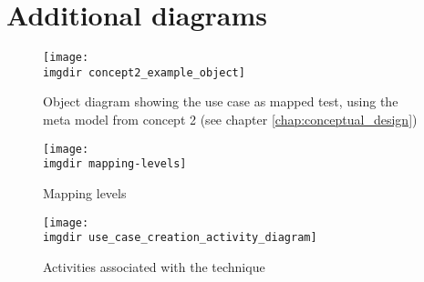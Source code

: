 \chapter{Additional diagrams}

\begin{figure}[!htbp]
  \centering
  \texttt{[image: \\imgdir concept2\_example\_object]}
  \caption{Object diagram showing the use case as mapped test, using the meta model from concept 2 (see chapter \ref{chap:conceptual_design})}
  \label{fig:concept2_example_object}
\end{figure}

\begin{figure}[!hbpt]
\centering
\texttt{[image: \\imgdir mapping-levels]}
\caption{Mapping levels}
\label{fig:mapping-levels}
\end{figure}

\begin{figure}[!hbpt]
\centering
\texttt{[image: \\imgdir use\_case\_creation\_activity\_diagram]}
\caption{Activities associated with the technique}
\label{fig:use_case_creation_activity_diagram}
\end{figure}
